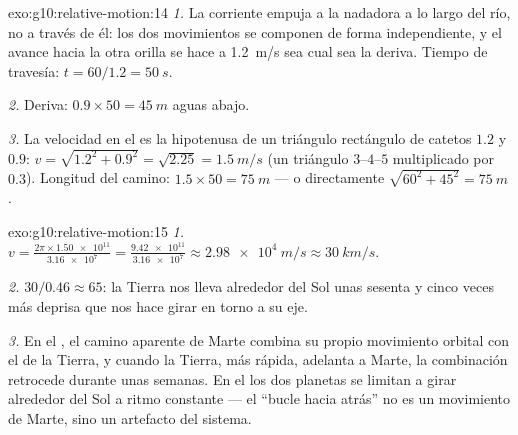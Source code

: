 \begin{solution}{exo:g10:relative-motion:14}
\emph{1.} La corriente empuja a la nadadora a lo largo del río, no a
través de él: los dos movimientos se componen de forma independiente, y
el avance hacia la otra orilla se hace a \qty{1.2}{m/s} sea cual sea la
deriva. Tiempo de travesía: $t = 60/1.2 = \qty{50}{s}$.

\emph{2.} Deriva: $0.9 \times 50 = \qty{45}{m}$ aguas abajo.

\emph{3.} La velocidad en el  es la hipotenusa de un
triángulo rectángulo de catetos $1.2$ y $0.9$:
$v = \sqrt{1.2^2 + 0.9^2} = \sqrt{2.25} = \qty{1.5}{m/s}$ (un triángulo
$3$--$4$--$5$ multiplicado por $0.3$). Longitud del camino:
$1.5 \times 50 = \qty{75}{m}$ --- o directamente
$\sqrt{60^2 + 45^2} = \qty{75}{m}$.
\end{solution}

\begin{solution}{exo:g10:relative-motion:15}
\emph{1.} $v = \frac{2\pi \times \num{1.50e11}}{\num{3.16e7}}
= \frac{\num{9.42e11}}{\num{3.16e7}} \approx \qty{2.98e4}{m/s}
\approx \qty{30}{km/s}$.

\emph{2.} $30 / 0.46 \approx 65$: la Tierra nos lleva alrededor del Sol
unas sesenta y cinco veces más deprisa que nos hace girar en torno a su
eje.

\emph{3.} En el , el camino aparente de Marte combina
su propio movimiento orbital con el de la Tierra, y cuando la Tierra,
más rápida, adelanta a Marte, la combinación retrocede durante unas
semanas. En el  los dos planetas se limitan a girar
alrededor del Sol a ritmo constante --- el ``bucle hacia atrás'' no es
un movimiento de Marte, sino un artefacto del sistema.
\end{solution}

